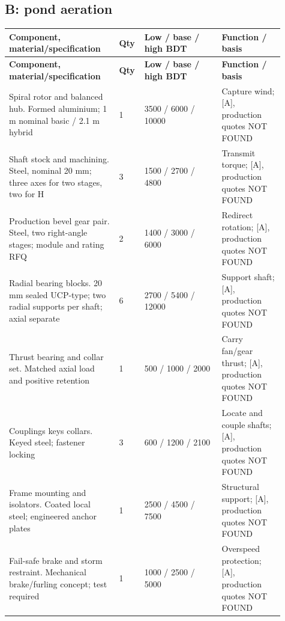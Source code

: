 \documentclass[11pt,a4paper]{article}
\begin{document}
\subsection{B: pond aeration}
{\footnotesize
\setlength{\tabcolsep}{3pt}\renewcommand{\arraystretch}{1.18}
\begin{longtable}{@{}>{\raggedright\arraybackslash}p{0.3784\linewidth}>{\raggedright\arraybackslash}p{0.0541\linewidth}>{\raggedright\arraybackslash}p{0.2613\linewidth}>{\raggedright\arraybackslash}p{0.2162\linewidth}@{}}
\toprule \textbf{Component, material/specification} & \textbf{Qty} & \textbf{Low / base / high BDT} & \textbf{Function / basis} \\ \midrule
\endfirsthead\toprule \textbf{Component, material/specification} & \textbf{Qty} & \textbf{Low / base / high BDT} & \textbf{Function / basis} \\ \midrule
\endhead\bottomrule\endfoot
Spiral rotor and balanced hub. Formed aluminium; 1 m nominal basic / 2.1 m hybrid & \num{1} & \num{3500} / \num{6000} / \num{10000} & Capture wind; [A], production quotes NOT FOUND \\
Shaft stock and machining. Steel, nominal 20 mm; three axes for two stages, two for H & \num{3} & \num{1500} / \num{2700} / \num{4800} & Transmit torque; [A], production quotes NOT FOUND \\
Production bevel gear pair. Steel, two right-angle stages; module and rating RFQ & \num{2} & \num{1400} / \num{3000} / \num{6000} & Redirect rotation; [A], production quotes NOT FOUND \\
Radial bearing blocks. 20 mm sealed UCP-type; two radial supports per shaft; axial separate & \num{6} & \num{2700} / \num{5400} / \num{12000} & Support shaft; [A], production quotes NOT FOUND \\
Thrust bearing and collar set. Matched axial load and positive retention & \num{1} & \num{500} / \num{1000} / \num{2000} & Carry fan/gear thrust; [A], production quotes NOT FOUND \\
Couplings keys collars. Keyed steel; fastener locking & \num{3} & \num{600} / \num{1200} / \num{2100} & Locate and couple shafts; [A], production quotes NOT FOUND \\
Frame mounting and isolators. Coated local steel; engineered anchor plates & \num{1} & \num{2500} / \num{4500} / \num{7500} & Structural support; [A], production quotes NOT FOUND \\
Fail-safe brake and storm restraint. Mechanical brake/furling concept; test required & \num{1} & \num{1000} / \num{2500} / \num{5000} & Overspeed protection; [A], production quotes NOT FOUND \\

\end{longtable}}
\end{document}
